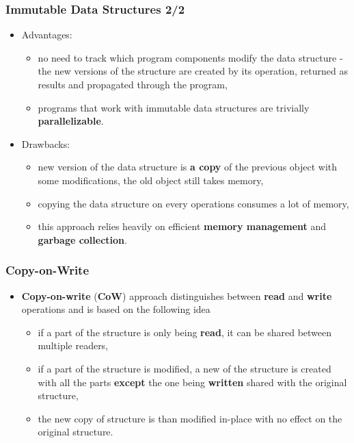 \documentclass{beamer}
\begin{document}
\begin{frame}[fragile]
  \frametitle{Immutable Data Structures 2/2}
  \begin{itemize}
  \item Advantages:
    \begin{itemize}
    \item no need to track which program components modify the data structure -
      the new versions of the structure are created by its operation, returned
      as results and propagated through the program,
    \item programs that work with immutable data structures are trivially
      \textbf{parallelizable}.
    \end{itemize}
  \item Drawbacks:
    \begin{itemize}
    \item new version of the data structure is \textbf{a copy} of the previous
      object with some modifications, the old object still takes memory,
    \item copying the data structure on every operations consumes a lot of
      memory,
    \item this approach relies heavily on efficient \textbf{memory management}
      and \textbf{garbage collection}.
    \end{itemize}
  \end{itemize}
\end{frame}

\begin{frame}[fragile]
  \frametitle{Copy-on-Write}
  \begin{itemize}
  \item \textbf{Copy-on-write} (\textbf{CoW}) approach distinguishes between
    \textbf{read} and \textbf{write} operations and is based on the following
    idea
    \begin{itemize}
    \item if a part of the structure is only being \textbf{read}, it can be
      shared between multiple readers,
    \item if a part of the structure is modified, a new of the structure is
      created with all the parts \textbf{except} the one being \textbf{written}
      shared with the original structure,
    \item the new copy of structure is than modified in-place with no effect on
      the original structure.
    \end{itemize}
  \end{itemize}
\end{frame}
\end{document}
